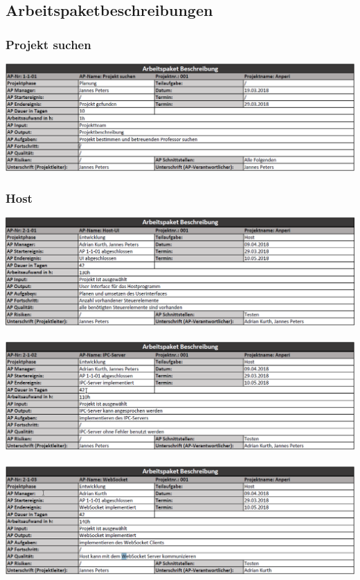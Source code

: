 \documentclass{scrartcl}
\begin{document}
\subsection{Arbeitspaketbeschreibungen}
\subsubsection{Projekt suchen}
\includegraphics[scale=0.6]{AP1-1-01.png}
\subsubsection{Host}
\includegraphics[scale=0.6]{AP2-1-01.png}
\\
\\
\includegraphics[scale=0.6]{AP2-1-02.png}
\\
\\
\includegraphics[scale=0.6]{AP2-1-03.png}
\end{document}
